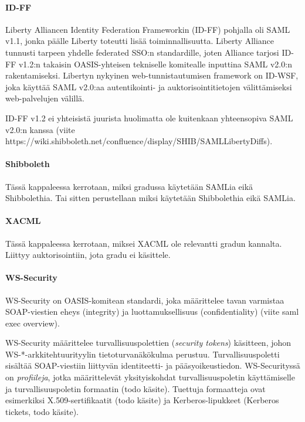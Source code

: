 \documentclass[finnish,gradu]{tktltiki}
\begin{document}
  \paragraph{ID-FF} %
  \label{par:id_ff}
  Liberty Alliancen Identity Federation Frameworkin (ID-FF) pohjalla oli SAML v1.1, jonka päälle Liberty toteutti lisää toiminnallisuutta.
  Liberty Alliance tunnusti tarpeen yhdelle federated SSO:n standardille, joten Alliance tarjosi ID-FF v1.2:n takaisin OASIS-yhteisen tekniselle komitealle inputtina SAML v2.0:n rakentamiseksi.
  Libertyn nykyinen web-tunnistautumisen framework on ID-WSF, joka käyttää SAML v2.0:aa autentikointi- ja auktorisointitietojen välittämiseksi web-palvelujen välillä.

  ID-FF v1.2 ei yhteisistä juurista huolimatta ole kuitenkaan yhteensopiva SAML v2.0:n kanssa (viite https://wiki.shibboleth.net/confluence/display/SHIB/SAMLLibertyDiffs).


  \paragraph{Shibboleth} %
  \label{par:saml_vs_shibboleth}
  Tässä kappaleessa kerrotaan, miksi gradussa käytetään SAMLia eikä Shibbolethia. Tai sitten perustellaan miksi käytetään Shibbolethia eikä SAMLia.


  \paragraph{XACML} %
  \label{par:xacml}
  Tässä kappaleessa kerrotaan, miksei XACML ole relevantti gradun kannalta. Liittyy auktorisointiin, jota gradu ei käsittele.


  \paragraph{WS-Security} %
  \label{par:ws_security}
  WS-Security on OASIS-komitean standardi, joka määrittelee tavan varmistaa SOAP-viestien eheys (integrity) ja luottamuksellisuus (confidentiality) (viite saml exec overview).

  WS-Security määrittelee turvallisuuspolettien (\emph{security tokens}) käsitteen, johon WS-*-arkkitehtuurityylin tietoturvanäkökulma perustuu.
  Turvallisuuspoletti sisältää SOAP-viestiin liittyvän identiteetti- ja pääsyoikeustiedon.
  WS-Securityssä on \emph{profiileja}, jotka määrittelevät yksityiskohdat turvallisuuspoletin käyttämiselle ja turvallisuuspoletin formaatin (todo käsite).
  Tuettuja formaatteja ovat esimerkiksi X.509-sertifikaatit (todo käsite) ja Kerberos-lipukkeet (Kerberos tickets, todo käsite).
\end{document}
